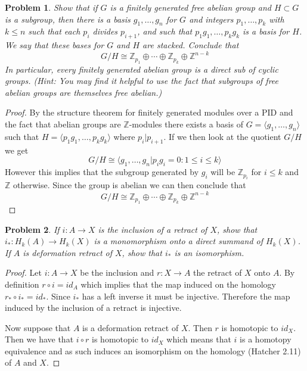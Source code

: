 \documentclass[10pt]{article}
\newcommand{\sk}{\vskip 10mm}
\newcommand{\bb}[1]{\mathbb{#1}}
\theoremstyle{plain}
\newtheorem{problem}{Problem}
\theoremstyle{remark}
\begin{document}
\begin{problem}
  Show that if $G$ is a finitely generated free abelian group
  and $H\subset G$ is a subgroup, then there is a basis $g_1,\ldots,g_n$
  for $G$ and integers $p_1,\ldots,p_k$ with $k\leq n$ such that
  each $p_i$ divides $p_{i+1}$, and such that $p_1g_1,\ldots,p_kg_k$ is
  a basis for $H$. We say that these bases for $G$ and $H$ are
  stacked. Conclude that
  \[ G/H\cong \bb{Z}_{p_1}\oplus\cdots\oplus\bb{Z}_{p_k}\oplus\bb{Z}^{n-k} \]
  In particular, every finitely generated abelian group is a
  direct sub of cyclic groups. (Hint: You may find it helpful to
  use the fact that subgroups of free abelian groups are themselves
  free abelian.)
\end{problem}

\begin{proof}
  By the structure theorem for finitely generated modules over a PID and the
  fact that abelian groups are $\bb{Z}$-modules there exists a basis of
  $G=\langle g_1,\ldots,g_n\rangle$ such that $H=\langle p_1g_1,\ldots,p_kg_k\rangle$ where
  $p_i|p_{i+1}$. If we then look at the quotient $G/H$ we get
  \[ G/H\cong \langle g_1,\ldots,g_n|p_ig_i=0:1\leq i\leq k\rangle \]
  However this implies that the subgroup generated by $g_i$ will be
  $\bb{Z}_{p_i}$ for $i\leq k$ and $\bb{Z}$ otherwise. Since the group is abelian
  we can then conclude that
  \[ G/H\cong \bb{Z}_{p_1}\oplus\cdots\oplus\bb{Z}_{p_k}\oplus\bb{Z}^{n-k} \]
\end{proof}

\sk

\begin{problem}
  If $i:A\rightarrow X$ is the inclusion of a retract of $X$, show that
  $i_*:H_k(A)\rightarrow H_k(X)$ is a monomorphism onto a direct summand of
  $H_k(X)$. If $A$ is deformation retract of $X$, show that
  $i_*$ is an isomorphism.
\end{problem}

\begin{proof}
  Let $i:A\rightarrow X$ be the inclusion and $r:X\rightarrow A$ the retract of $X$ onto $A$.
  By definition $r\circ i =id_A$ which implies that the map induced on the
  homology $r_*\circ i_* = id_*$. Since $i_*$ has a left inverse it must be
  injective. Therefore the map induced by the inclusion of a retract is
  injective.

  Now suppose that $A$ is a deformation retract of $X$. Then $r$ is
  homotopic to $id_X$. Then we have that $i\circ r$ is homotopic to $id_X$
  which means that $i$ is a homotopy equivalence and as such induces
  an isomorphism on the homology (Hatcher 2.11) of $A$ and $X$.
\end{proof}
\end{document}
